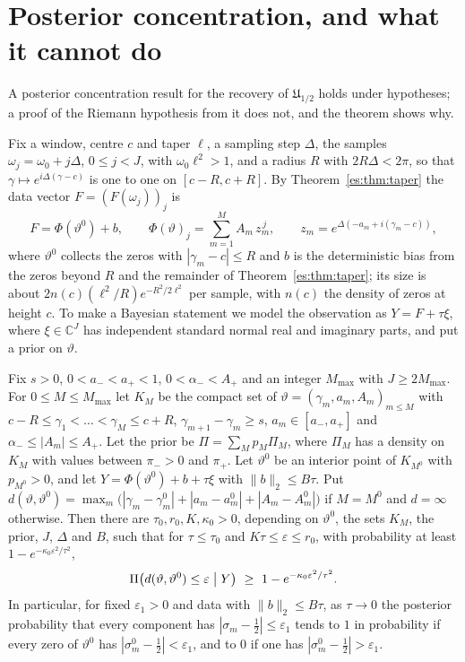 \section{Posterior concentration, and what it cannot do}\label{es:sec:posterior}

A posterior concentration result for the recovery of $\mathfrak U_{1/2}$ holds under hypotheses; a proof of the Riemann hypothesis from it does not, and the theorem shows why.

Fix a window, centre $c$ and taper $\ell$, a sampling step $\Delta$, the samples $\omega_j=\omega_0+j\Delta$, $0\le j<J$, with $\omega_0\ell^2>1$, and a radius $R$ with $2R\Delta<2\pi$, so that $\gamma\mapsto e^{i\Delta(\gamma-c)}$ is one to one on $[c-R,c+R]$. By Theorem~\ref{es:thm:taper} the data vector $F=(F(\omega_j))_j$ is
\[
F=\Phi(\vartheta^0)+b,\qquad\Phi(\vartheta)_j=\sum_{m=1}^MA_m\,z_m^{\,j},\qquad z_m=e^{\Delta(-a_m+i(\gamma_m-c))},
\]
where $\vartheta^0$ collects the zeros with $|\gamma_m-c|\le R$ and $b$ is the deterministic bias from the zeros beyond $R$ and the remainder of Theorem~\ref{es:thm:taper}; its size is about $2n(c)(\ell^2/R)e^{-R^2/2\ell^2}$ per sample, with $n(c)$ the density of zeros at height $c$. To make a Bayesian statement we model the observation as $Y=F+\tau\xi$, where $\xi\in\mathbb C^J$ has independent standard normal real and imaginary parts, and put a prior on $\vartheta$.

\begin{theorem}\label{es:thm:concentration}
Fix $s>0$, $0<a_-<a_+<1$, $0<\alpha_-<A_+$ and an integer $M_{\max}$ with $J\ge2M_{\max}$. For $0\le M\le M_{\max}$ let $K_M$ be the compact set of $\vartheta=(\gamma_m,a_m,A_m)_{m\le M}$ with $c-R\le\gamma_1<\dots<\gamma_M\le c+R$, $\gamma_{m+1}-\gamma_m\ge s$, $a_m\in[a_-,a_+]$ and $\alpha_-\le|A_m|\le A_+$. Let the prior be $\Pi=\sum_Mp_M\Pi_M$, where $\Pi_M$ has a density on $K_M$ with values between $\pi_->0$ and $\pi_+$. Let $\vartheta^0$ be an interior point of $K_{M^0}$ with $p_{M^0}>0$, and let $Y=\Phi(\vartheta^0)+b+\tau\xi$ with $\|b\|_2\le B\tau$. Put $d(\vartheta,\vartheta^0)=\max_m\bigl(|\gamma_m-\gamma^0_m|+|a_m-a^0_m|+|A_m-A^0_m|\bigr)$ if $M=M^0$ and $d=\infty$ otherwise. Then there are $\tau_0,r_0,K,\kappa_0>0$, depending on $\vartheta^0$, the sets $K_M$, the prior, $J$, $\Delta$ and $B$, such that for $\tau\le\tau_0$ and $K\tau\le\varepsilon\le r_0$, with probability at least $1-e^{-\kappa_0\varepsilon^2/\tau^2}$,
\[
\Pi\bigl(d(\vartheta,\vartheta^0)\le\varepsilon\bigm|Y\bigr)\ \ge\ 1-e^{-\kappa_0\varepsilon^2/\tau^2}.
\]
In particular, for fixed $\varepsilon_1>0$ and data with $\|b\|_2\le B\tau$, as $\tau\to0$ the posterior probability that every component has $|\sigma_m-\tfrac12|\le\varepsilon_1$ tends to $1$ in probability if every zero of $\vartheta^0$ has $|\sigma^0_m-\tfrac12|<\varepsilon_1$, and to $0$ if one has $|\sigma^0_m-\tfrac12|>\varepsilon_1$.
\end{theorem}

